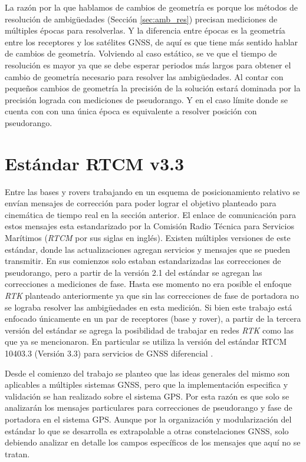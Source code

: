 \documentclass[a4paper,12pt,oneside,onecolumn,final,openright]{book}%
\begin{document}
	La razón por la que hablamos de cambios de geometría es porque los métodos de resolución de ambigüedades (Sección \ref{sec:amb_res}) precisan mediciones de múltiples épocas para resolverlas. Y la diferencia entre épocas es la geometría entre los receptores y los satélites GNSS, de aquí es que tiene más sentido hablar de cambios de geometría. Volviendo al caso estático, se ve que el tiempo de resolución es mayor ya que se debe esperar periodos más largos para obtener el cambio de geometría necesario para resolver las ambigüedades. Al contar con pequeños cambios de geometría la precisión de la solución estará dominada por la precisión lograda con mediciones de pseudorango. Y en el caso límite donde se cuenta con con una única época es equivalente a resolver posición con pseudorango.

\section{Estándar RTCM v3.3}\label{sec:RTCM}
	Entre las bases y rovers trabajando en un esquema de posicionamiento relativo se envían mensajes de corrección para poder lograr el objetivo planteado para cinemática de tiempo real en la sección anterior. El enlace de comunicación para estos mensajes esta estandarizado por la Comisión Radio Técnica para Servicios Marítimos (\textit{RTCM} por sus siglas en inglés). Existen múltiples versiones de este estándar, donde las actualizaciones agregan servicios y mensajes que se pueden transmitir. En sus comienzos solo estaban estandarizadas las correcciones de pseudorango, pero a partir de la versión 2.1 del estándar se agregan las correcciones a mediciones de fase. Hasta ese momento no era posible el enfoque \textit{RTK} planteado anteriormente ya que sin las correcciones de fase de portadora no se lograba resolver las ambigüedades en esta medición. Si bien este trabajo está enfocado únicamente en un par de receptores (base y rover), a partir de la tercera versión del estándar se agrega la posibilidad de trabajar en redes \textit{RTK} como las que ya se mencionaron. En particular se utiliza la versión del estándar RTCM 10403.3 (Versión 3.3) para servicios de GNSS diferencial \cite{rtcm}.
	
	Desde el comienzo del trabajo se planteo que las ideas generales del mismo son aplicables a múltiples sistemas GNSS, pero que la implementación especifica y validación se han realizado sobre el sistema GPS. Por esta razón es que solo se analizarán los mensajes particulares para correcciones de pseudorango y fase de portadora en el sistema GPS. Aunque por la organización y modularización del estándar lo que se desarrolla es extrapolable a otras constelaciones GNSS, solo debiendo analizar en detalle los campos específicos de los mensajes que aquí no se tratan.
	
\end{document}
